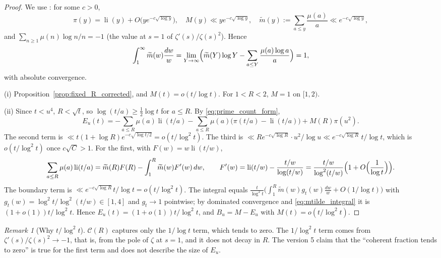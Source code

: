 \documentclass[11pt]{amsart}
\numberwithin{equation}{section}
\theoremstyle{plain}
\theoremstyle{definition}
\theoremstyle{remark}
\newtheorem{remark}[theorem]{Remark}
\DeclareMathOperator{\li}{li}
\newcommand{\Cc}{\mathcal{C}}
\newcommand{\mt}{\widetilde{m}}
\begin{document}
\begin{proof}
We use \cite{MontgomeryVaughan2007}: for some $c>0$,
\begin{equation}
\label{eq:pnt_inputs}
  \pi(y)=\li(y)+O\bigl(ye^{-c\sqrt{\log y}}\bigr),\quad
  M(y)\ll ye^{-c\sqrt{\log y}},\quad
  \mt(y):=\sum_{a\le y}\frac{\mu(a)}a\ll e^{-c\sqrt{\log y}},
\end{equation}
and $\sum_{n\ge1}\mu(n)\log n/n=-1$ (the value at $s=1$ of
$\zeta'(s)/\zeta(s)^2$). Hence
\begin{equation}
\label{eq:mtilde_integral}
  \int_1^\infty\mt(w)\frac{dw}w
  =\lim_{Y\to\infty}\Bigl(\mt(Y)\log Y-\sum_{a\le Y}\frac{\mu(a)\log a}a\Bigr)=1,
\end{equation}
with absolute convergence.

(i) Proposition~\ref{prop:fixed_R_corrected}, and $M(t)=o(t/\log t)$. For
$1<R<2$, $M=1$ on $[1,2)$.

(ii) Since $t<u^4$, $R<\sqrt t$, so $\log(t/a)\ge\frac12\log t$ for
$a\le R$. By \eqref{eq:prime_count_form},
\begin{equation}
\label{eq:E_three_terms}
  E_u(t)=-\sum_{a\le R}\mu(a)\li(t/a)
  -\sum_{a\le R}\mu(a)\bigl(\pi(t/a)-\li(t/a)\bigr)+M(R)\pi(u^2).
\end{equation}
The second term is $\ll t(1+\log R)e^{-c\sqrt{\log t/2}}=o(t/\log^2t)$. The
third is $\ll Re^{-c\sqrt{\log R}}\cdot u^2/\log u\ll e^{-c\sqrt{\log R}}\,
t/\log t$, which is $o(t/\log^2t)$ once $c\sqrt C>1$. For the first, with
$F(w)=w\li(t/w)$,
\begin{equation}
\label{eq:partial_summation_li}
  \sum_{a\le R}\mu(a)\li(t/a)=\mt(R)F(R)-\int_1^R\mt(w)F'(w)\,dw,
  \qquad
  F'(w)=\li(t/w)-\frac{t/w}{\log(t/w)}=\frac{t/w}{\log^2(t/w)}\Bigl(1+O\Bigl(\frac1{\log t}\Bigr)\Bigr).
\end{equation}
The boundary term is $\ll e^{-c\sqrt{\log R}}t/\log t=o(t/\log^2t)$. The
integral equals
$\frac t{\log^2t}\bigl(\int_1^R\mt(w)g_t(w)\frac{dw}w+O(1/\log t)\bigr)$ with
$g_t(w)=\log^2t/\log^2(t/w)\in[1,4]$ and $g_t\to1$ pointwise; by dominated
convergence and \eqref{eq:mtilde_integral} it is $(1+o(1))t/\log^2t$. Hence
$E_u(t)=(1+o(1))t/\log^2t$, and $B_u=M-E_u$ with $M(t)=o(t/\log^2t)$.
\end{proof}

\begin{remark}[Why $t/\log^2t$]
\label{rem:why_log2}
$\Cc(R)$ captures only the $1/\log t$ term, which tends to zero. The
$1/\log^2t$ term comes from $\zeta'(s)/\zeta(s)^2\to-1$, that is, from the
pole of $\zeta$ at $s=1$, and it does not decay in $R$. The version 5 claim
that the ``coherent fraction tends to zero'' is true for the first term and
does not describe the size of $E_u$.
\end{remark}
\end{document}
